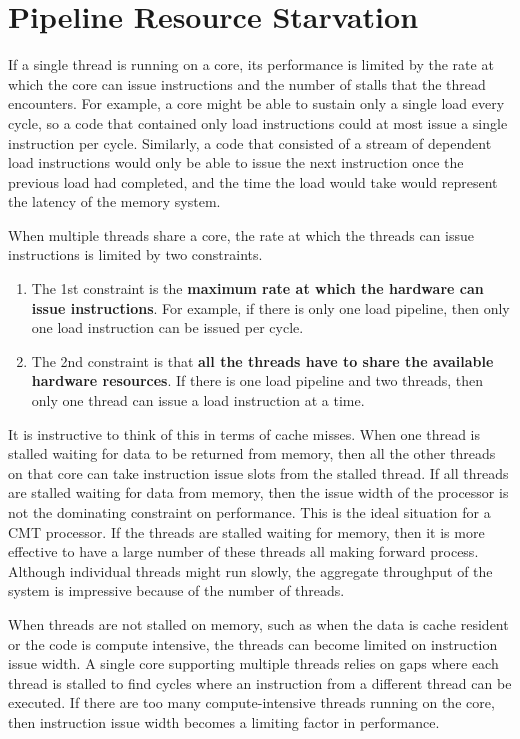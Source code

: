 \documentclass[12pt,a4paper]{report}
\begin{document}
\section{Pipeline Resource Starvation}
If a single thread is running on a core, its performance is limited by the rate at which the core can issue instructions and the number of stalls that the thread encounters. For example, a core might be able to sustain only a single load every cycle, so a code that contained only load instructions could at most issue a single instruction per cycle. Similarly, a code that consisted of a stream of dependent load instructions would only be able to issue the next instruction once the previous load had completed, and the time the load would take would represent the latency of the memory system.
\par
When multiple threads share a core, the rate at which the threads can issue instructions is limited by two constraints.
\begin{enumerate}
	\item The 1st constraint is the\textbf{ maximum rate at which the hardware can issue instructions}. For example, if there is only one load pipeline, then only one load instruction can be issued per cycle.
	\item The 2nd constraint is that \textbf{all the threads have to share the available hardware resources}. If there is one load pipeline and two threads, then only one thread can issue a load instruction at a time.
\end{enumerate}
It is instructive to think of this in terms of cache misses. When one thread is stalled waiting for data to be returned from memory, then all the other threads on that core can take instruction issue slots from the stalled thread. If all threads are stalled waiting for data from memory, then the issue width of the processor is not the dominating constraint on performance. This is the ideal situation for a CMT processor. If the threads are stalled waiting for memory, then it is more effective to have a large number of these threads all making forward process. Although individual threads might run slowly, the aggregate throughput of the system is impressive because of the number of threads.
\par
When threads are not stalled on memory, such as when the data is cache resident or the code is compute intensive, the threads can become limited on instruction issue width. A single core supporting multiple threads relies on gaps where each thread is stalled to find cycles where an instruction from a different thread can be executed. If there are too many compute-intensive threads running on the core, then instruction issue width becomes a limiting factor in performance.
\end{document}
